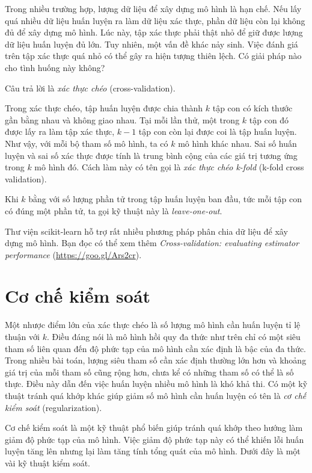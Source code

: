 Trong nhiều trường hợp, lượng dữ liệu để xây dựng mô hình là hạn chế. Nếu lấy
quá nhiều dữ liệu huấn luyện ra làm dữ liệu xác thực, phần dữ liệu còn lại không
đủ để xây dựng mô hình. Lúc này, tập xác thực phải thật nhỏ để giữ được lượng dữ
liệu huấn luyện đủ lớn. Tuy nhiên, một vấn đề khác nảy sinh. Việc đánh giá trên tập xác thực quá nhỏ có thể gây ra hiện tượng thiên lệch. Có giải pháp nào cho tình huống này không?

Câu trả lời là \textit{xác thực chéo} ({cross-validation}).

Trong xác thực chéo, tập huấn luyện được chia thành $k$ tập con có kích thước gần bằng nhau và không giao nhau. Tại mỗi lần thử, một trong $k$ tập con đó được lấy ra làm tập xác thực, $k-1$ tập con còn lại được coi là tập huấn luyện. Như vậy, với mỗi bộ tham số mô hình, ta có $k$ mô hình khác nhau. Sai số huấn luyện và sai số xác thực được tính là trung bình cộng của các giá trị tương ứng trong $k$ mô hình đó. Cách làm này có tên gọi là \textit{xác thực chéo k-fold} (k-fold cross validation).

Khi $k$ bằng với số lượng phần tử trong tập huấn luyện ban đầu, tức mỗi
tập con có đúng một phần tử, ta gọi kỹ thuật này là \textit{leave-one-out}.

Thư viện scikit-learn hỗ trợ rất nhiều phương pháp phân chia dữ liệu để xây dựng mô hình. Bạn đọc có thể xem thêm
\textit{Cross-validation: evaluating estimator performance} (\url{https://goo.gl/Ars2cr}).





\section{Cơ chế kiểm soát}

Một nhược điểm lớn của xác thực chéo là số lượng mô hình cần huấn luyện tỉ lệ
thuận với $k$. Điều đáng nói là mô hình hồi quy đa thức như trên chỉ có một siêu
tham số liên quan đến độ phức tạp của mô hình cần xác định là bậc của đa thức.
Trong nhiều bài toán, lượng siêu tham số cần xác định thường lớn hơn và
khoảng giá trị của mỗi tham số cũng rộng hơn, chưa kể có những
tham số có thể là số thực. Điều này dẫn đến việc huấn luyện nhiều mô hình là khó
khả thi. Có một kỹ thuật tránh quá khớp khác giúp giảm số mô hình cần huấn
luyện có tên là \textit{cơ chế kiểm soát} (regularization).

{Cơ chế kiểm soát} là một kỹ thuật phổ biến giúp tránh quá khớp theo hướng làm
giảm độ phức tạp của mô hình. Việc giảm độ phức tạp này có thể khiến lỗi huấn
luyện tăng lên nhưng lại làm tăng tính tổng quát của mô hình. Dưới đây là một
vài kỹ thuật kiểm soát.

